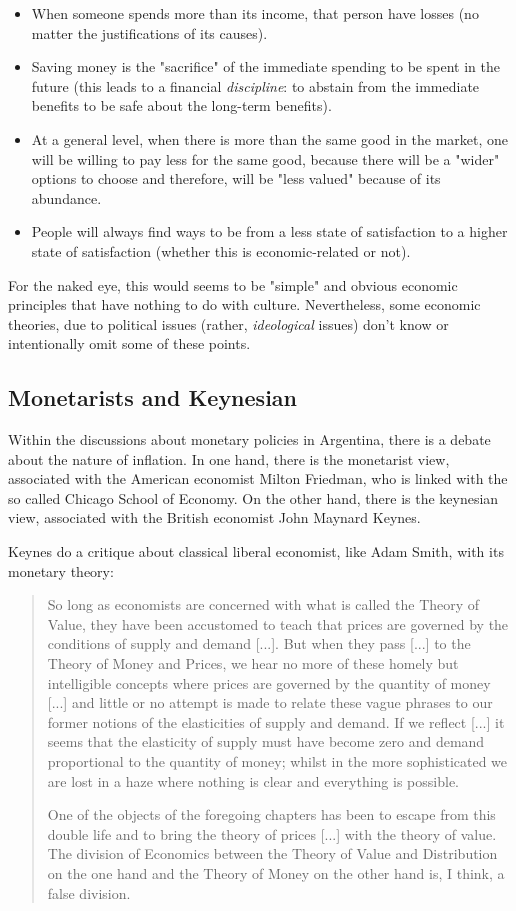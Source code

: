 \documentclass[12pt,a4paper,twoside]{book}
\begin{document}
\begin{itemize}
\item When someone spends more than its income, that person have losses (no matter the justifications of its causes).
\item Saving money is the "sacrifice" of the immediate spending to be spent in the future (this leads to a financial \textit{discipline}: to abstain from the immediate benefits to be safe about the long-term benefits).
\item At a general level, when there is more than the same good in the market, one will be willing to pay less for the same good, because there will be a "wider" options to choose and therefore, will be "less valued" because of its abundance.
\item People will always find ways to be from a less state of satisfaction to a higher state of satisfaction (whether this is economic-related or not).
\end{itemize}

For the naked eye, this would seems to be "simple" and obvious economic principles that have nothing to do with culture. Nevertheless, some economic theories, due to political issues (rather, \textit{ideological} issues) don't know or intentionally omit some of these points.

\subsection{Monetarists and Keynesian}
Within the discussions about monetary policies in Argentina, there is a debate about the nature of inflation. In one hand, there is the monetarist view, associated with the American economist Milton Friedman, who is linked with the so called Chicago School of Economy. On the other hand, there is the keynesian view, associated with the British economist John Maynard Keynes.

Keynes do a critique about classical liberal economist, like Adam Smith, with its monetary theory:

\begin{quotation}
So long as economists are concerned with what is called the Theory of Value, they have been accustomed to teach that prices are governed by the conditions of supply and demand [...]. But when they pass [...] to the Theory of Money and Prices, we hear no more of these homely but intelligible concepts where prices are governed by the quantity of money [...] and little or no attempt is made to relate these vague phrases to our former notions of the elasticities of supply and demand. If we reflect [...] it seems that the elasticity of supply must have become zero and demand proportional to the quantity of money; whilst in the more sophisticated we are lost in a haze where nothing is clear and everything is possible.

One of the objects of the foregoing chapters has been to escape from this double life and to bring the theory of prices [...] with the theory of value. The division of Economics between the Theory of Value and Distribution on the one hand and the Theory of Money on the other hand is, I think, a false division. \cite[pp. 292-293]{keynes}
\end{quotation}
\end{document}
